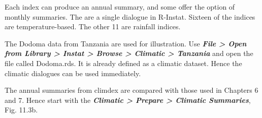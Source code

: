 \documentclass[
  letterpaper,
  DIV=11,
  numbers=noendperiod]{scrreprt}
\begin{document}
Each index can produce an annual summary, and some offer the option of
monthly summaries. The are a single dialogue in R-Instat. Sixteen of the
indices are temperature-based. The other 11 are rainfall indices.

The Dodoma data from Tanzania are used for illustration. Use
\textbf{\emph{File \textgreater{} Open from Library \textgreater{}
Instat \textgreater{} Browse \textgreater{} Climatic \textgreater{}
Tanzania}} and open the file called Dodoma.rds. It is already defined as
a climatic dataset. Hence the climatic dialogues can be used
immediately.

The annual summaries from climdex are compared with those used in
Chapters 6 and 7. Hence start with the \textbf{\emph{Climatic
\textgreater{} Prepare \textgreater{} Climatic Summaries}}, Fig. 11.3b.
\end{document}
